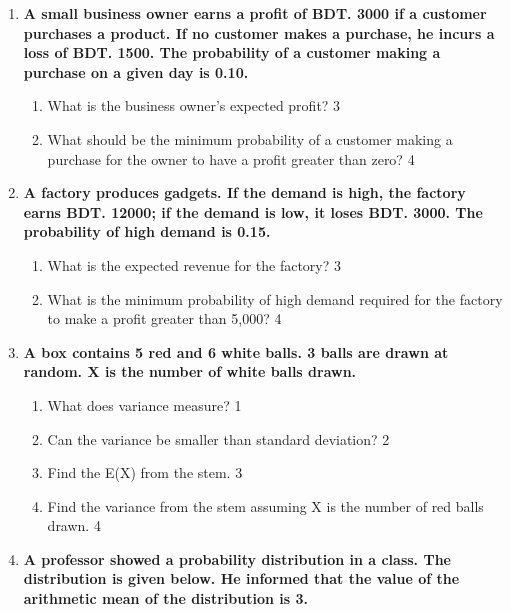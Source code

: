 \documentclass[a4paper,oneside, margin=1.4in]{book}
\begin{document}
\begin{enumerate}
  \item
\textbf{A small business owner earns a profit of BDT. 3000 if a customer purchases a product. If no customer makes a purchase, he incurs a loss of BDT. 1500. The probability of a customer making a purchase on a given day is 0.10.} 

\begin{enumerate}
    \item
    What is the business owner's expected profit? \hfill 3

    \item
    What should be the minimum probability of a customer making a purchase for the owner to have a profit greater than zero? \hfill 4
\end{enumerate}

\item
\textbf{A factory produces gadgets. If the demand is high, the factory earns BDT. 12000; if the demand is low, it loses BDT. 3000. The probability of high demand is 0.15.}

\begin{enumerate}
    \item
    What is the expected revenue for the factory? \hfill 3

    \item
    What is the minimum probability of high demand required for the factory to make a profit greater than 5,000? \hfill 4
\end{enumerate}

  
     \item
	  \textbf{A box contains 5 red and 6 white balls. 3 balls are drawn at random. X is the number of white balls drawn.} 
  
  \begin{enumerate}
    \item
	What does variance measure? \hfill 1
    \item
	Can the variance be smaller than standard deviation? \hfill 2
    \item  
	Find the E(X) from the stem. \hfill 3
    \item
	Find the variance from the stem assuming X is the number of red balls drawn. \hfill 4
  \end{enumerate}
  
   \item
	  \textbf{A professor showed a probability distribution in a class. The distribution is given below. He informed that the value of the arithmetic mean of the distribution is 3.}
	  

\end{enumerate}
\end{document}
